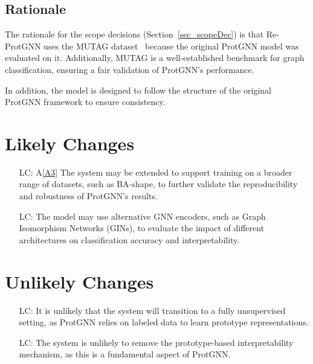 \documentclass[12pt]{article}
\newcommand{\aref}[1]{A\ref{#1}}
\newcounter{lcnum} %
\begin{document}
\subsection{Rationale}

The rationale for the scope decisions (Section~\ref{sec_scopeDec}) is that Re-ProtGNN uses the MUTAG dataset~\cite{debnath1991structure} because the original ProtGNN model was evaluated on it. Additionally, MUTAG is a well-established benchmark for graph classification, ensuring a fair validation of ProtGNN's performance.

In addition, the model is designed to follow the structure of the original ProtGNN framework to ensure consistency.


\section{Likely Changes}    

\noindent \begin{itemize}

\item[LC\refstepcounter{lcnum}\thelcnum\label{LC_Data}:] \aref{A3} The system may be extended to support training on a broader range of datasets, such as BA-shape,  to further validate the reproducibility and robustness of ProtGNN's results.

\item[LC\refstepcounter{lcnum}\thelcnum\label{LC_Encoder}:] The model may use alternative GNN encoders, such as Graph Isomorphism Networks (GINs), to evaluate the impact of different architectures on classification accuracy and interpretability.

\end{itemize}



\section{Unlikely Changes}    

\noindent \begin{itemize}

\item[LC\refstepcounter{lcnum}\thelcnum\label{LC_Unsupervised}:] It is unlikely that the system will transition to a fully unsupervised setting, as ProtGNN relies on labeled data to learn prototype representations.

\item[LC\refstepcounter{lcnum}\thelcnum\label{LC_Prot}:] The system is unlikely to remove the prototype-based interpretability mechanism, as this is a fundamental aspect of ProtGNN.

\end{itemize}
\end{document}

